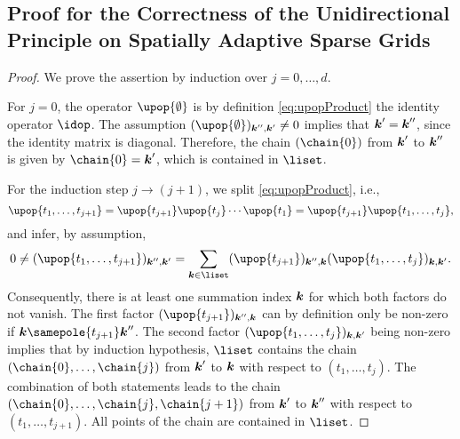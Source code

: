\printornamentsfalse
\subsection{%
  Proof for the Correctness of the Unidirectional Principle on
  Spatially Adaptive Sparse Grids%
}
\label{sec:proofCorrectnessUnidirectionalPrincipleSASG}
\printornamentstrue

\lemmaChainExistenceSufficient*

\begin{proof}
  We prove the assertion by induction over $j = 0, \dotsc, d$.
  
  For $j = 0$, the operator $\upop{\emptyset}$ is by definition
  \eqref{eq:upopProduct} the identity operator $\idop$.
  The assumption $(\upop{\emptyset})_{\*k'',\*k'} \not= 0$
  implies that ${\boldsymbol{k}}' = {\boldsymbol{k}}''$, since the identity matrix is diagonal.
  Therefore, the chain $(\chain{0})$ from ${\boldsymbol{k}}'$ to ${\boldsymbol{k}}''$ is given by
  $\chain{0} = \*k'$, which is contained in $\liset$.
  
  For the induction step $j \to (j+1)$, we split \cref{eq:upopProduct},
  i.e.,
  \begin{equation}
    \upop{t_1,\dotsc,t_{j+1}}
    = \upop{t_{j+1}} \upop{t_j} \dotsm \upop{t_1}
    = \upop{t_{j+1}} \upop{t_1,\dotsc,t_j},
  \end{equation}
  and infer, by assumption,
  \begin{equation}
    \label{eq:proofLemmaChainExistenceSufficient1}
    0
    \not= (\upop{t_1,\dotsc,t_{j+1}})_{\*k'',\*k'}
    = \sum_{\*k \in \liset} (\upop{t_{j+1}})_{\*k'',\*k}
    (\upop{t_1,\dotsc,t_j})_{\*k,\*k'}.
  \end{equation}
  Consequently,
  there is at least one summation index ${\boldsymbol{k}}$
  for which both factors do not vanish.
  The first factor $(\upop{t_{j+1}})_{\*k'',\*k}$ can by definition
  only be non-zero if $\*k \samepole{t_{j+1}} \*k''$.
  The second factor $(\upop{t_1,\dotsc,t_j})_{\*k,\*k'}$ being
  non-zero implies that by induction hypothesis,
  $\liset$ contains the chain $(\chain{0}, \dotsc, \chain{j})$
  from ${\boldsymbol{k}}'$ to ${\boldsymbol{k}}$ with respect to $(t_1, \dotsc, t_j)$.
  The combination of both statements leads to
  the chain $(\chain{0}, \dotsc, \chain{j}, \chain{j+1})$ from ${\boldsymbol{k}}'$
  to ${\boldsymbol{k}}''$ with respect to $(t_1, \dotsc, t_{j+1})$.
  All points of the chain are contained in $\liset$.
\end{proof}

\lemmaChainExistenceNecessary*

